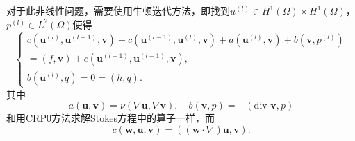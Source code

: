 \documentclass{ctexart}
\begin{document}
对于此非线性问题，需要使用牛顿迭代方法，即找到$u^{(l)} \in H^1(\Omega) \times H^1(\Omega)$，
$p^{(l)} \in L^2(\Omega)$使得
\begin{equation}
    \left\{\begin{matrix}
        c(\mathbf{u}^{(l)}, \mathbf{u}^{(l-1)}, \mathbf{v} ) 
+ c(\mathbf{u}^{(l-1)}, \mathbf{u}^{(l)}, \mathbf{v} ) +
a(\mathbf{u}^{(l)} , \mathbf{v}) 
+  b(\mathbf{v},p^{(l)} )\\
= (f,\mathbf{v}) + c(\mathbf{u}^{(l-1)}, \mathbf{u}^{(l-1)}, \mathbf{v} ),\\ 
        b(\mathbf{u}^{(l)}, q ) = 0 = (h, q) .
\end{matrix}\right.
\end{equation}
其中
$$
a(\mathbf{u,v})=\nu(\nabla \mathbf{u},\nabla \mathbf{v}), 
\quad b(\mathbf{v},p)=-(\text{div } \mathbf{v},p)
$$
和用CRP0方法求解Stokes方程中的算子一样，而
$$
c(\mathbf{w,u,v})= ((\mathbf{w} \cdot \nabla)\mathbf{u}, \mathbf{v}).
$$
\end{document}
